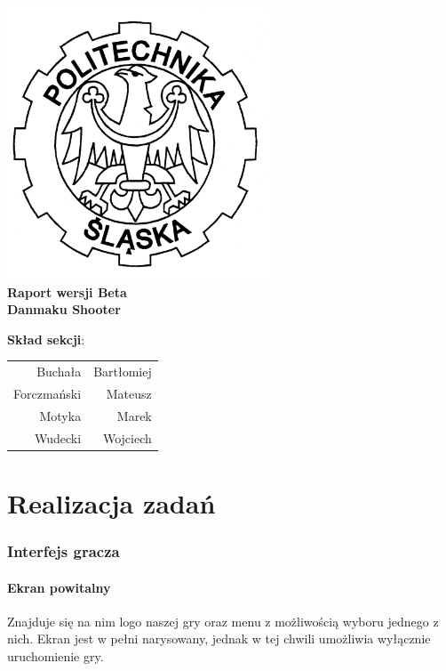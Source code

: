 \documentclass[a4paper,twoside]{article}
\begin{document}
\begin{titlepage}
		\centering
		\includegraphics[width=0.6\textwidth]{./images/logo.png}
		\\\vspace{10mm}
		\textbf{{\huge Raport wersji Beta}}\\\vspace{5mm}
		\textbf{{\Huge Danmaku Shooter}}
		\\
		\vfill
		\begin{flushright}
			{\Large \textbf{Skład sekcji}:}\\
			\begin{tabular}{rr}
				{\Large Buchała} & {\Large Bartłomiej}\\[-3pt]
				{\Large Forczmański} & {\Large Mateusz}\\[-3pt]
				{\Large Motyka} & {\Large Marek}\\[-3pt]
				{\Large Wudecki} & {\Large Wojciech}
			\end{tabular}
		\end{flushright}
	\end{titlepage}
	
	\newpage
	\part{Realizacja zadań}
		\section{Interfejs gracza}
			\subsection{Ekran powitalny}
				Znajduje się na nim logo naszej gry oraz menu z możliwością wyboru jednego z nich. Ekran jest w pełni narysowany, jednak w tej chwili umożliwia wyłącznie uruchomienie gry.
\end{document}
